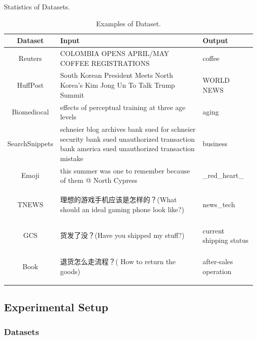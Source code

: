 \begin{table}[th]
\begin{threeparttable}
\begin{tablenotes}
\end{tablenotes}

\end{threeparttable}
\caption{Statistics of Datasets.}

\label{table:statsOfDataset}
\end{table}
\begin{table}[th]
	\small
	\centering
	\begin{tabular}{c P{11cm}P{3cm}}
	\hline
	Dataset & Input     &      Output          \\ \hline
	Reuters     & COLOMBIA OPENS APRIL/MAY COFFEE REGISTRATIONS & coffee         \\ 
	HuffPost &South Korean President Meets North Korea's Kim Jong Un To Talk Trump Summit &WORLD NEWS\\ 
	Biomediocal & effects of perceptual training at three age levels & aging \\ 
	SearchSnippets & schneier blog archives bank sued for schneier security bank sued unauthorized transaction bank america sued unauthorized transaction mistake & business\\ 
	Emoji & this summer was one to remember because of them @ North Cypress& \_red\_heart\_ \\
	TNEWS & \begin{CJK}{UTF8}{gbsn}理想的游戏手机应该是怎样的？(What should an ideal gaming phone look like?)\end{CJK} & news\_tech \\ 
	GCS     & \begin{CJK}{UTF8}{gbsn}货发了没？(Have you shipped my stuff?)\end{CJK} &  current shipping status      \\ 
	Book & \begin{CJK}{UTF8}{gbsn}退货怎么走流程？(
		How to return the goods)\end{CJK}	&  after-sales operation \\ \hline
	
	\end{tabular}
	\caption{Examples of Dataset.}
	\label{table:exampleOfDataset}
	\end{table}

\subsection{Experimental Setup}
\subsubsection{Datasets} 

